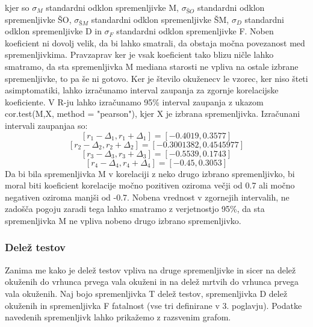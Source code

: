 \documentclass[a4paper,11pt]{article}
\begin{document}
kjer so \(\sigma_{M}\) standardni odklon spremenljivke M, \(\sigma_{ŠO}\) standardni odklon spremenljivke ŠO, \(\sigma_{ŠM}\) standardni odklon spremenljivke ŠM, \(\sigma_{D}\) standardni odklon spremenljivke D in \(\sigma_{F}\) standardni odklon spremenljivke F. Noben koeficient ni dovolj velik, da bi lahko smatrali, da obstaja močna povezanost med spremenljivkima. Pravzaprav ker je vsak koeficient tako blizu ničle lahko smatramo, da sta spremenljivka M mediana starosti ne vpliva na ostale izbrane spremenljivke, to pa še ni gotovo. Ker je število okuženecv le vzorec, ker niso šteti asimptomatiki, lahko izračunamo interval zaupanja za zgornje korelacijske koeficiente. V R-ju lahko izračunamo 95\% interval zaupanja z ukazom cor.test(M,X, method = "pearson"), kjer X je izbrana spremenljivka. Izračunani intervali zaupanjaa so:
\[[r_1 - \Delta_1, r_1 + \Delta_1] = [-0.4019, 0.3577]\]
\[[r_2 - \Delta_2, r_2 + \Delta_2] = [-0.3001382, 0.4545977]\]
\[[r_3 - \Delta_3, r_3+ \Delta_3] = [-0.5539, 0.1743]\]
\[[r_4 - \Delta_4, r_4 + \Delta_4] = [-0.45, 0.3053]\]
Da bi bila spremenljivka M v korelaciji z neko drugo izbrano spremenljivko, bi moral biti koeficient korelacije močno pozitiven oziroma večji od 0.7 ali močno negativen oziroma manjši od -0.7. Nobena vrednost v zgornejih intervalih, ne zadošča pogoju zaradi tega lahko smatramo z verjetnostjo 95\%, da sta spremenljivka M ne vpliva nobeno drugo izbrano spremenljivko.

\subsubsection{Delež testov}

Zanima me kako je delež testov vpliva na druge spremenljivke in sicer na delež okuženih do vrhunca prvega vala okuženi in na delež mrtvih do vrhunca prvega vala okuženih. Naj bojo spremenljivka T delež testov, spremenljivka D delež okuženih in spremenljivka F fatalnost (vse tri definirane v 3. poglavju). Podatke navedenih spremenljivk lahko prikažemo z razsvenim grafom.

\begin{figure}
    \centering
\end{figure}
\end{document}
